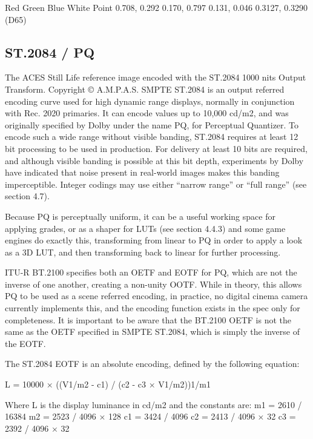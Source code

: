 Red
Green
Blue
White Point
0.708, 0.292
0.170, 0.797
0.131, 0.046
0.3127, 0.3290 (D65)

\subsection{ST.2084 / PQ}

The ACES Still Life reference image encoded with the ST.2084 1000 nits Output Transform.
Copyright © A.M.P.A.S.
SMPTE ST.2084 is an output referred encoding curve used for high dynamic range displays, normally in conjunction with Rec. 2020 primaries. It can encode values up to 10,000 cd/m2, and was originally specified by Dolby under the name PQ, for Perceptual Quantizer. To encode such a wide range without visible banding, ST.2084 requires at least 12 bit processing to be used in production. For delivery at least 10 bits are required, and although visible banding is possible at this bit depth, experiments by Dolby have indicated that noise present in real-world images makes this banding imperceptible. Integer codings may use either “narrow range” or “full range” (see section 4.7).

Because PQ is perceptually uniform, it can be a useful working space for applying grades, or as a shaper for LUTs (see section 4.4.3) and some game engines do exactly this, transforming from linear to PQ in order to apply a look as a 3D LUT, and then transforming back to linear for further processing.

ITU-R BT.2100 specifies both an OETF and EOTF for PQ, which are not the inverse of one another, creating a non-unity OOTF. While in theory, this allows PQ to be used as a scene referred encoding, in practice, no digital cinema camera currently implements this, and the encoding function exists in the spec only for completeness. It is important to be aware that the BT.2100 OETF is not the same as the OETF specified in SMPTE ST.2084, which is simply the inverse of the EOTF.

The ST.2084 EOTF is an absolute encoding, defined by the following equation:

	L = 10000 × ((V1/m2 - c1) / (c2 - c3 × V1/m2))1/m1

Where L is the display luminance in cd/m2 and the constants are:
	m1 = 2610 / 16384
	m2 = 2523 / 4096 × 128
	c1 = 3424 / 4096
	c2 = 2413 / 4096 × 32
	c3 = 2392 / 4096 × 32



